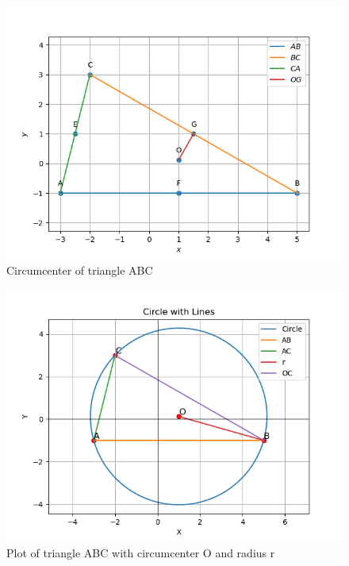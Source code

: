 \documentclass[journal,12pt,twocolumn]{IEEEtran}
\theoremstyle{remark}
\begin{document}
\begin{figure}[h]
              \centering
              \includegraphics[width=\columnwidth]{./figs/fig1.4.3.png}
              \caption{Circumcenter of triangle ABC}
              \label{fig:13}
\end{figure}
\begin{figure}[h]
              \centering
              \includegraphics[width=\columnwidth]{./figs/fig1.4.5.png}
              \caption{Plot of triangle ABC with circumcenter O and radius r}
              \label{fig:14}
\end{figure}
\end{document}
